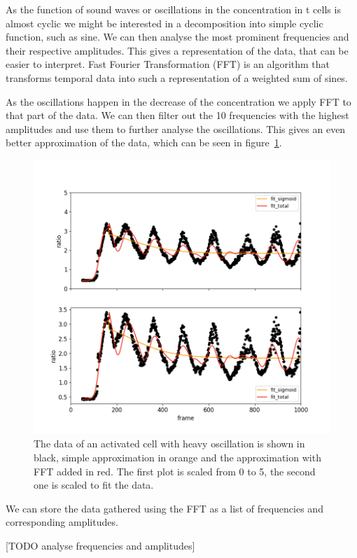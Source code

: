 As the function of sound waves or oscillations in the \Calcium concentration in t cells is almost cyclic we might be interested in a decomposition into simple cyclic function, such as sine. We can then analyse the most prominent frequencies and their respective amplitudes. This gives a representation of the data, that can be easier to interpret. Fast Fourier Transformation (FFT) is an algorithm that transforms temporal data into such a representation of a weighted sum of sines.

As the oscillations happen in the decrease of the \Calcium concentration we apply FFT to that part of the data. We can then filter out the 10 frequencies with the highest amplitudes and use them to further analyse the oscillations. This gives an even better approximation of the data, which can be seen in figure~\ref{fig:particle_vis_fft_approx}.

\begin{figure}[h]
	\centering
	\includegraphics[width=\textwidth]{fig/particle_vis_fft_approx_pos}
	
	\caption{The data of an activated cell with heavy oscillation is shown in black, simple approximation in orange and the approximation with FFT added in red. The first plot is scaled from 0 to 5, the second one is scaled to fit the data.}
	\label{fig:particle_vis_fft_approx}
\end{figure}

We can store the data gathered using the FFT as a list of frequencies and corresponding amplitudes.

[TODO analyse frequencies and amplitudes]


